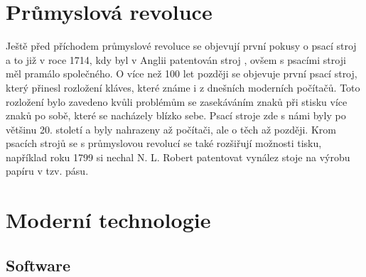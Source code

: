 \section{Průmyslová revoluce}

Ještě před příchodem průmyslové revoluce se objevují první pokusy o psací stroj a to již v roce 1714, kdy byl v Anglii patentován stroj
 \cite{FirstTypewriter}, ovšem s psacími stroji měl pramálo společného. O více než 100 let později se
objevuje první psací stroj, který přinesl rozložení kláves, které známe i z dnešních moderních počítačů. Toto rozložení bylo zavedeno kvůli
problémům se zasekáváním znaků při stisku více znaků po sobě, které se nacházely blízko sebe. Psací stroje zde s námi byly po většinu 20. století
a byly nahrazeny až počítači, ale o těch až později. Krom psacích strojů se s průmyslovou revolucí se také rozšiřují možnosti tisku, například roku 1799
si nechal N. L. Robert patentovat vynález stoje na výrobu papíru v tzv.  pásu. \cite{Papir}

\section{Moderní technologie}

\subsection{Software}